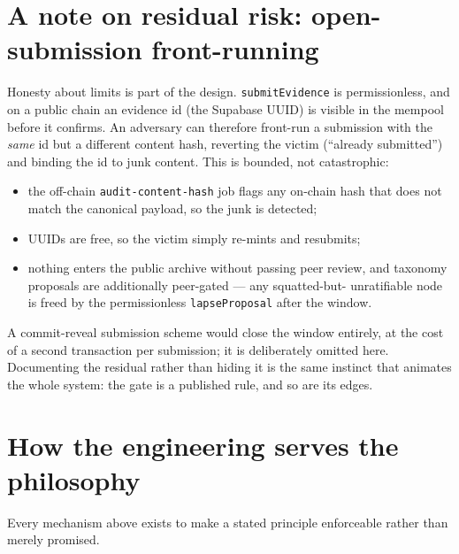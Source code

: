 \documentclass[11pt,a4paper]{article}
\begin{document}
\section{A note on residual risk: open-submission front-running}

Honesty about limits is part of the design. \texttt{submitEvidence} is
permissionless, and on a public chain an evidence id (the Supabase UUID) is
visible in the mempool before it confirms. An adversary can therefore
front-run a submission with the \emph{same} id but a different content hash,
reverting the victim (``already submitted'') and binding the id to junk
content. This is bounded, not catastrophic:

\begin{itemize}[leftmargin=1.4em]
  \item the off-chain \texttt{audit-content-hash} job flags any on-chain hash
  that does not match the canonical payload, so the junk is detected;
  \item UUIDs are free, so the victim simply re-mints and resubmits;
  \item nothing enters the public archive without passing peer review, and
  taxonomy proposals are additionally peer-gated --- any squatted-but-
  unratifiable node is freed by the permissionless \texttt{lapseProposal}
  after the window.
\end{itemize}

A commit-reveal submission scheme would close the window entirely, at the
cost of a second transaction per submission; it is deliberately omitted here.
Documenting the residual rather than hiding it is the same instinct that
animates the whole system: the gate is a published rule, and so are its
edges.

\section{How the engineering serves the philosophy}

Every mechanism above exists to make a stated principle enforceable rather
than merely promised.
\end{document}
